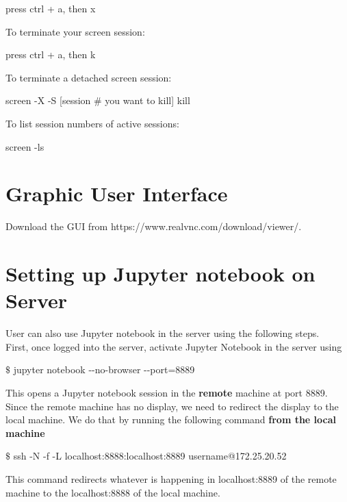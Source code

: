 \begin{mdframed}
press ctrl + a, then x
\end{mdframed}

To terminate your screen session:
\begin{mdframed}
press ctrl + a, then k
\end{mdframed}

To terminate a detached screen session:
\begin{mdframed}
screen -X -S [session \# you want to kill] kill
\end{mdframed}

To list session numbers of active sessions:
\begin{mdframed}
screen -ls
\end{mdframed}

\section{Graphic User Interface}

Download the GUI from https://www.realvnc.com/download/viewer/.\\

\section{Setting up Jupyter notebook on Server}
User can also use Jupyter notebook in the server using the following steps.\\

First, once logged into the server, activate Jupyter Notebook in the server using

\begin{framed}
$\$$ jupyter notebook -{}-no-browser -{}-port=8889
\end{framed}

This opens a Jupyter notebook session in the \textbf{remote} machine at port 8889. Since the remote machine has no display, we need to redirect the display to the local machine. We do that by running the following command \textbf{from the local machine}

\begin{framed}
$\$$ ssh -N -f -L localhost:8888:localhost:8889 username@172.25.20.52
\end{framed}

This command redirects whatever is happening in localhost:8889 of the remote machine to the localhost:8888 of the local machine. \\

